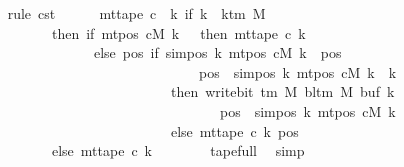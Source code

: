 \begin{isabellebody}
\ \ \ \ \ \ \isamarkupfalse%
\ {\isacharparenleft}{\kern0pt}rule\ c{}{\isacharunderscore}{\kern0pt}st{\isacharparenright}{\kern0pt}\isanewline
\ \ \ \ \isamarkupfalse%
\ {\isachardoublequoteopen}mt{\isacharunderscore}{\kern0pt}tape\ c{}\ {\isacharequal}{\kern0pt}\ {\isacharparenleft}{\kern0pt}{\isasymlambda}k{\isachardot}{\kern0pt}\ if\ k\ {\isacharless}{\kern0pt}\ k{\isacharunderscore}{\kern0pt}tm\ M\isanewline
\ \ \ \ \ \ \ \ \ \ \ \ \ \ then\ {\isacharparenleft}{\kern0pt}if\ mt{\isacharunderscore}{\kern0pt}pos\ cM\ k\ {\isacharequal}{\kern0pt}\ {}\ then\ mt{\isacharunderscore}{\kern0pt}tape\ c{}\ k\isanewline
\ \ \ \ \ \ \ \ \ \ \ \ \ \ \ \ \ \ \ \ else\ {\isacharparenleft}{\kern0pt}{\isasymlambda}pos{\isachardot}{\kern0pt}\ if\ sim{\isacharunderscore}{\kern0pt}pos\ {\isacharquery}{\kern0pt}k\ {\isacharparenleft}{\kern0pt}mt{\isacharunderscore}{\kern0pt}pos\ cM\ k{\isacharparenright}{\kern0pt}\ {\isasymle}\ pos\isanewline
\ \ \ \ \ \ \ \ \ \ \ \ \ \ \ \ \ \ \ \ \ \ \ \ \ \ \ \ \ \ \ \ \ \ {\isasymand}\ pos\ {\isacharless}{\kern0pt}\ sim{\isacharunderscore}{\kern0pt}pos\ {\isacharquery}{\kern0pt}k\ {\isacharparenleft}{\kern0pt}mt{\isacharunderscore}{\kern0pt}pos\ cM\ k{\isacharparenright}{\kern0pt}\ {\isacharplus}{\kern0pt}\ {\isacharquery}{\kern0pt}k\isanewline
\ \ \ \ \ \ \ \ \ \ \ \ \ \ \ \ \ \ \ \ \ \ \ \ \ \ \ \ \ \ \ then\ write{\isacharunderscore}{\kern0pt}bit\ {\isacharparenleft}{\kern0pt}{\isasymGamma}{\isacharunderscore}{\kern0pt}tm\ M{\isacharparenright}{\kern0pt}\ {\isacharparenleft}{\kern0pt}bl{\isacharunderscore}{\kern0pt}tm\ M{\isacharparenright}{\kern0pt}\ {\isacharparenleft}{\kern0pt}buf\ k{\isacharparenright}{\kern0pt}\isanewline
\ \ \ \ \ \ \ \ \ \ \ \ \ \ \ \ \ \ \ \ \ \ \ \ \ \ \ \ \ \ \ \ \ \ \ \ \ \ {\isacharparenleft}{\kern0pt}pos\ {\isacharminus}{\kern0pt}\ sim{\isacharunderscore}{\kern0pt}pos\ {\isacharquery}{\kern0pt}k\ {\isacharparenleft}{\kern0pt}mt{\isacharunderscore}{\kern0pt}pos\ cM\ k{\isacharparenright}{\kern0pt}{\isacharparenright}{\kern0pt}\isanewline
\ \ \ \ \ \ \ \ \ \ \ \ \ \ \ \ \ \ \ \ \ \ \ \ \ \ \ \ \ \ \ else\ mt{\isacharunderscore}{\kern0pt}tape\ c{}\ k\ pos{\isacharparenright}{\kern0pt}{\isacharparenright}{\kern0pt}\isanewline
\ \ \ \ \ \ \ \ \ \ \ \ \ \ else\ mt{\isacharunderscore}{\kern0pt}tape\ c{}\ k{\isacharparenright}{\kern0pt}{\isachardoublequoteclose}\isanewline
\ \ \ \ \ \ \isamarkupfalse%
\ tape{\isacharunderscore}{\kern0pt}full\ \isamarkupfalse%
\ simp\isanewline

\end{isabellebody}
